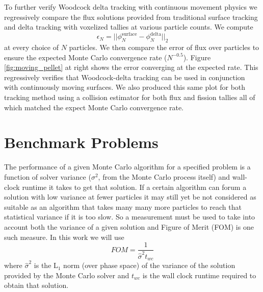 To further verify Woodcock delta tracking with continuous movement physics we regressively compare the flux solutions provided from traditional surface tracking and delta tracking with voxelized tallies at various particle counts.
We compute 
\begin{equation}
    \epsilon_N = ||\phi_N^{\text{surface}} - \phi_N^{\text{delta}} ||_2
\end{equation}
at every choice of $N$ particles.
We then compare the error of flux over particles to ensure the expected Monte Carlo convergence rate ($N^{-0.5}$).
Figure \ref{fig:moving_pellet} at right shows the error converging at the expected rate.
This regressively verifies that Woodcock-delta tracking can be used in conjunction with continuously moving surfaces.
We also produced this same plot for both tracking method using a collision estimator for both flux and fission tallies all of which matched the expect Monte Carlo convergence rate.

\section{Benchmark Problems}
\label{sec:benchmarks}

The performance of a given Monte Carlo algorithm for a specified problem is a function of solver variance ($\sigma^2$, from the Monte Carlo process itself) and wall-clock runtime it takes to get that solution.
If a certain algorithm can forum a solution with low variance at fewer particles it may still yet be not considered as suitable as an algorithm that takes many many more particles to reach that statistical variance if it is too slow.
So a measurement must be used to take into account both the variance of a given solution and Figure of Merit (FOM) is one such measure. In this work we will use 
\begin{equation}
    FOM = \frac{1}{\hat{\sigma}^2 t_{wc}}
\end{equation}
where $\hat{\sigma}^2$ is the L$_{1}$ norm (over phase space) of the variance of the solution provided by the Monte Carlo solver and $t_{wc}$ is the wall clock runtime required to obtain that solution.


